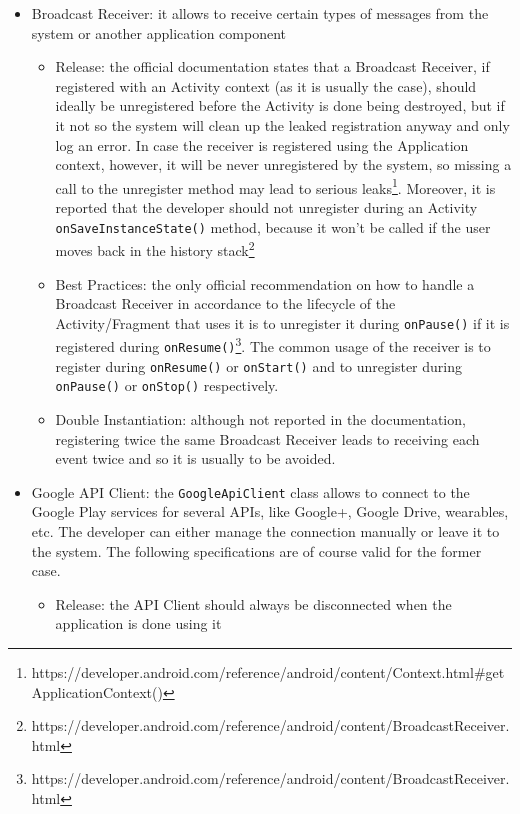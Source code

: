 \documentclass[11pt,a4paper,notitlepage]{article}
\begin{document}
\begin{itemize}
	\item Broadcast Receiver: it allows to receive certain types of messages from the system or another application component
	\begin{itemize}
		\item Release: the official documentation states that a Broadcast Receiver, if registered with an Activity context (as it is usually the case), should ideally be unregistered before the Activity is done being destroyed, but if it not so the system will clean up the leaked registration anyway and only log an error. In case the receiver is registered using the Application context, however, it will be never unregistered by the system, so missing a call to the unregister method may lead to serious leaks\footnote{https://developer.android.com/reference/android/content/Context.html\#getApplicationContext()}. Moreover, it is reported that the developer should not unregister during an Activity \texttt{onSaveInstanceState()} method, because it won't be called if the user moves back in the history stack\footnote{https://developer.android.com/reference/android/content/BroadcastReceiver.html}
		\item Best Practices: the only official recommendation on how to handle a Broadcast Receiver in accordance to the lifecycle of the Activity/Fragment that uses it is to unregister it during \texttt{onPause()} if it is registered during \texttt{onResume()}\footnote{https://developer.android.com/reference/android/content/BroadcastReceiver.html}. The common usage of the receiver is to register during \texttt{onResume()} or \texttt{onStart()} and to unregister during \texttt{onPause()} or \texttt{onStop()} respectively.
		\item Double Instantiation: although not reported in the documentation, registering twice the same Broadcast Receiver leads to receiving each event twice and so it is usually to be avoided.
	\end{itemize}
	\item Google API Client: the \texttt{GoogleApiClient} class allows to connect to the Google Play services for several APIs, like Google+, Google Drive, wearables, etc. The developer can either manage the connection manually or leave it to the system. The following specifications are of course valid for the former case.
	\begin{itemize}
		\item Release: the API Client should always be disconnected when the application is done using it

\end{itemize}
\end{itemize}
\end{document}
